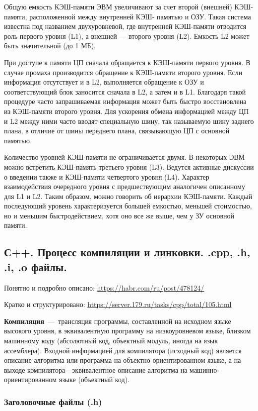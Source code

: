 \documentclass{article}
\begin{document}
Общую емкость КЭШ-памяти ЭВМ увеличивают за счет второй (внешней) КЭШ-памяти, расположенной между внутренней КЭШ- памятью и ОЗУ. Такая система известна под названием двухуровневой, где внутренней КЭШ-памяти отводится роль первого уровня (L1), а внешней — второго уровня (L2). Емкость L2 может быть значительной (до 1 МБ). 

При доступе к памяти ЦП сначала обращается к КЭШ-памяти первого уровня. В случае промаха производится обращение к КЭШ-памяти второго уровня. Если информация отсутствует и в L2, выполняется обращение к ОЗУ и соответствующий блок заносится сначала в L2, а затем и в L1. Благодаря такой процедуре часто запрашиваемая информация может быть быстро восстановлена из КЭШ-памяти второго уровня. Для ускорения обмена информацией между ЦП и L2 между ними часто вводят специальную шину, так называемую шину заднего плана, в отличие от шины переднего плана, связывающую ЦП с основной памятью. 

Количество уровней КЭШ-памяти не ограничивается двумя. В некоторых ЭВМ можно встретить КЭШ-память третьего уровня (L3). Ведутся активные дискуссии о введении также и КЭШ-памяти четвертого уровня (L4). Характер взаимодействия очередного уровня с предшествующим аналогичен описанному для L1 и L2. Таким образом, можно говорить об иерархии КЭШ-памяти. Каждый последующий уровень характеризуется большей емкостью, меньшей стоимостью, но и меньшим быстродействием, хотя оно все же выше, чем у ЗУ основной памяти.

\subsection{С++. Процесс компиляции и линковки. .cpp, .h, .i, .o файлы.}
Понятно и подробно описано: 
\href{https://habr.com/ru/post/478124/}{https://habr.com/ru/post/478124/}

Кратко и структурировано: \href{https://server.179.ru/tasks/cpp/total/105.html}{https://server.179.ru/tasks/cpp/total/105.html}

\textbf{Компиляция}~---~трансляция программы, составленной на исходном языке высокого уровня, в эквивалентную программу на низкоуровневом языке, близком машинному коду (абсолютный код, объектный модуль, иногда на язык ассемблера). Входной информацией для компилятора (исходный код) является описание алгоритма или программа на объектно-ориентированном языке, а на выходе компилятора—эквивалентное описание алгоритма на машинно-ориентированном языке (объектный код).

\subsubsection{Заголовочные файлы (.h)}
\end{document}
